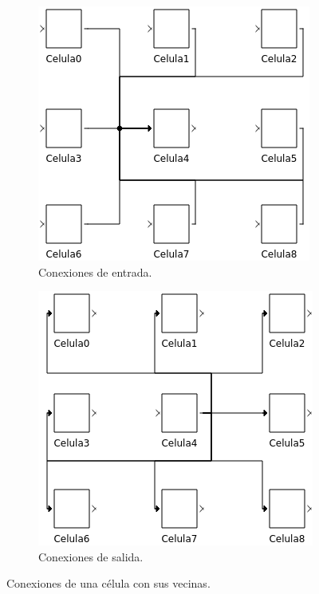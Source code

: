\documentclass[12pt]{article}
\begin{document}
\begin{figure}[ht]
  \centering
  \begin{subfigure}[b]{0.45\textwidth}
    \includegraphics[width=\textwidth]{imagenes/entrada}
    \caption{Conexiones de entrada.}
    \label{img:coneciones_entrada}
  \end{subfigure}
  \hfill
  \begin{subfigure}[b]{0.45\textwidth}
    \includegraphics[width=\textwidth]{imagenes/salida}
    \caption{Conexiones de salida.}
    \label{img:coneciones_salida}
  \end{subfigure}
  \caption{Conexiones de una célula con sus vecinas.}
  \label{img:conexiones}
\end{figure}
\end{document}

